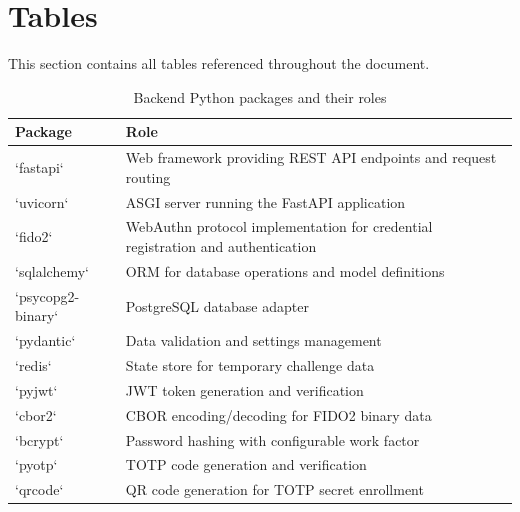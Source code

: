 \section{Tables}\label{sec:tables}

This section contains all tables referenced throughout the document.

\begin{table}[t]
\centering
\small
\caption{Backend Python packages and their roles}
\label{tab:backend-packages}
\begin{tabular}{p{2.5cm}p{11cm}}
  \toprule
  Package & Role \\
  \midrule
  `fastapi` & Web framework providing REST API endpoints and request routing \\
  `uvicorn` & ASGI server running the FastAPI application \\
  `fido2` & WebAuthn protocol implementation for credential registration and authentication \\
  `sqlalchemy` & ORM for database operations and model definitions \\
  `psycopg2-binary` & PostgreSQL database adapter \\
  `pydantic` & Data validation and settings management \\
  `redis` & State store for temporary challenge data \\
  `pyjwt` & JWT token generation and verification \\
  `cbor2` & CBOR encoding/decoding for FIDO2 binary data \\
  `bcrypt` & Password hashing with configurable work factor \\
  `pyotp` & TOTP code generation and verification \\
  `qrcode` & QR code generation for TOTP secret enrollment \\
  \bottomrule
\end{tabular}
\end{table}

